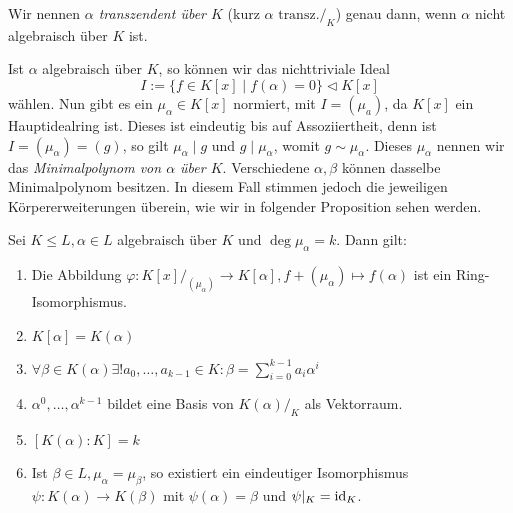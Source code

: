\begin{definition}
    Wir nennen \emph{$\alpha$ transzendent über $K$} (kurz $\alpha \text { transz.}/_K$) genau dann, wenn $\alpha$ nicht algebraisch über $K$ ist.
\end{definition}

\begin{remark}
    Ist $\alpha$ algebraisch über $K$, so können wir das nichttriviale Ideal
    $$ I := \{ f \in K[x] \mid f(\alpha) = 0 \} \vartriangleleft K[x] $$
    wählen. Nun gibt es ein $\mu_\alpha \in K[x]$ normiert, mit $I = (\mu_a)$, da $K[x]$ ein Hauptidealring ist. Dieses ist eindeutig bis auf Assoziiertheit, denn ist $I = (\mu_\alpha) = (g)$, so gilt $\mu_\alpha \mid g$ und $g \mid \mu_\alpha$, womit $g \sim \mu_\alpha$. Dieses $\mu_\alpha$ nennen wir das \emph{Minimalpolynom von $\alpha$ über $K$}. Verschiedene $\alpha, \beta$ können dasselbe Minimalpolynom besitzen. In diesem Fall stimmen jedoch die jeweiligen Körpererweiterungen überein, wie wir in folgender Proposition sehen werden.
\end{remark}

\begin{proposition}
    Sei $K \leq L, \alpha \in L$ algebraisch über $K$ und $\deg \mu_\alpha = k$. Dann gilt:
    \begin{enumerate}
        \item Die Abbildung $\varphi : K[x]/_{(\mu_\alpha)} \to K[\alpha], f + (\mu_\alpha) \mapsto f(\alpha)$ ist ein Ring-Isomorphismus.
        \item $K[\alpha] = K(\alpha)$
        \item $\forall \beta \in K(\alpha) \exists ! a_0, \hdots, a_{k-1} \in K: \beta = \sum_{i=0}^{k-1}a_i \alpha^i$
        \item $\alpha^0, \hdots, \alpha^{k-1}$ bildet eine Basis von $K(\alpha)/_K$ als Vektorraum.
        \item $[K(\alpha) : K] = k$
        \item Ist $\beta \in L, \mu_\alpha = \mu_\beta$, so existiert ein eindeutiger Isomorphismus $\psi : K(\alpha) \to K(\beta)$ mit $\psi(\alpha) = \beta$ und $\psi\vert_K = \operatorname{id}_K$.
    \end{enumerate}
\end{proposition}

